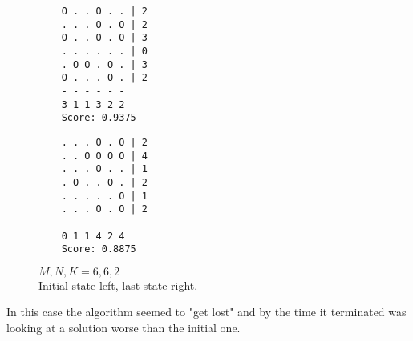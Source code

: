 \begin{figure}[h!]
\begin{multicols}{2}
    \begin{verbatim}
    O . . O . . | 2
    . . . O . O | 2
    O . . O . O | 3
    . . . . . . | 0
    . O O . O . | 3
    O . . . O . | 2
    - - - - - -
    3 1 1 3 2 2
    Score: 0.9375
    \end{verbatim}
    \columnbreak
    \begin{verbatim}
    . . . O . O | 2
    . . O O O O | 4
    . . . O . . | 1
    . O . . O . | 2
    . . . . . O | 1
    . . . O . O | 2
    - - - - - -
    0 1 1 4 2 4
    Score: 0.8875
    \end{verbatim}
    \end{multicols}
\caption{$M, N, K = 6, 6, 2$\\
Initial state left, last state right.}
\end{figure}
In this case the algorithm seemed to "get lost"
and by the time it terminated was looking at a solution worse than the initial one.